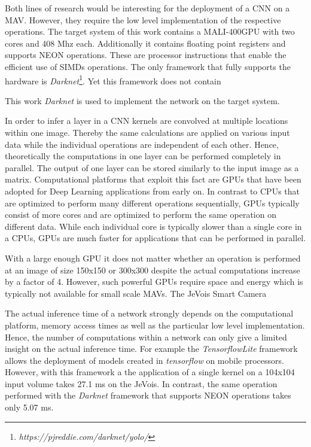 Both lines of research would be interesting for the deployment of a \ac{CNN} on a \ac{MAV}. However, they require the low level implementation of the respective operations. The target system of this work contains a MALI-400GPU with two cores and 408 Mhz each. Additionally it contains floating point registers and supports NEON operations. These are processor instructions that enable the efficient use of \acp{SIMD} operations. The only framework that fully supports the hardware is \textit{Darknet}\footnote{\textit{https://pjreddie.com/darknet/yolo/}}. Yet this framework does not contain 

 This work \textit{Darknet} is used to implement the network on the target system.




In order to infer a layer in a \ac{CNN} kernels are convolved at multiple locations within one image. Thereby the same calculations are applied on various input data while the individual operations are independent of each other. Hence, theoretically the computations in one layer can be performed completely in parallel. The output of one layer can be stored similarly to the input image as a matrix. Computational platforms that exploit this fact are \acp{GPU} that have been adopted for Deep Learning applications from early on. In contrast to \acp{CPU} that are optimized to perform many different operations sequentially, \acp{GPU} typically consist of more cores and are optimized to perform the same operation on different data. While each individual core is typically slower than a single core in a \acp{CPU}, \acp{GPU} are much faster for applications that can be performed in parallel.

With a large enough \ac{GPU} it does not matter whether an operation is performed at an image of size 150x150 or 300x300 despite the actual computations increase by a factor of 4. However, such powerful \acp{GPU} require space and energy which is typically not available for small scale \acp{MAV}. The JeVois Smart Camera 

The actual inference time of a network strongly depends on the computational platform, memory access times as well as the particular low level implementation. Hence, the number of computations within a network can only give a limited insight on the actual inference time. For example the \textit{TensorflowLite} framework allows the deployment of models created in \textit{tensorflow} on mobile processors. However, with this framework a the application of a single kernel on a 104x104 input volume takes 27.1 ms on the JeVois. In contrast, the same operation performed with the \textit{Darknet} framework that supports NEON operations takes only 5.07 ms.





